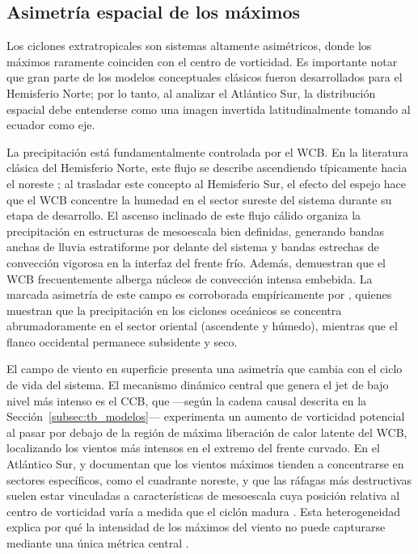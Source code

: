 \subsection{Asimetría espacial de los máximos}\label{subsec:tb_kde_asimetria}

Los ciclones extratropicales son sistemas altamente asimétricos, donde los máximos raramente coinciden con el centro de vorticidad. Es importante notar que gran parte de los modelos conceptuales clásicos fueron desarrollados para el Hemisferio Norte; por lo tanto, al analizar el Atlántico Sur, la distribución espacial debe entenderse como una imagen invertida latitudinalmente tomando al ecuador como eje.

La precipitación está fundamentalmente controlada por el WCB. En la literatura clásica del Hemisferio Norte, este flujo se describe ascendiendo típicamente hacia el noreste \citep{blanchard2021warm}; al trasladar este concepto al Hemisferio Sur, el efecto del espejo hace que el WCB concentre la humedad en el sector sureste del sistema durante su etapa de desarrollo. El ascenso inclinado de este flujo cálido organiza la precipitación en estructuras de mesoescala bien definidas, generando bandas anchas de lluvia estratiforme por delante del sistema y bandas estrechas de convección vigorosa en la interfaz del frente frío. Además, \citet{oertel2021warm} demuestran que el WCB frecuentemente alberga núcleos de convección intensa embebida. La marcada asimetría de este campo es corroborada empíricamente por \citet{naud2020evaluation}, quienes muestran que la precipitación en los ciclones oceánicos se concentra abrumadoramente en el sector oriental (ascendente y húmedo), mientras que el flanco occidental permanece subsidente y seco.

El campo de viento en superficie presenta una asimetría que cambia con el ciclo de vida del sistema. El mecanismo dinámico central que genera el jet de bajo nivel más intenso es el CCB, que —según la cadena causal descrita en la Sección~\ref{subsec:tb_modelos}— experimenta un aumento de vorticidad potencial al pasar por debajo de la región de máxima liberación de calor latente del WCB, localizando los vientos más intensos en el extremo del frente curvado. En el Atlántico Sur, \citet{bitencourt2010relating} y \citet{cardoso2022synoptic} documentan que los vientos máximos tienden a concentrarse en sectores específicos, como el cuadrante noreste, y que las ráfagas más destructivas suelen estar vinculadas a características de mesoescala cuya posición relativa al centro de vorticidad varía a medida que el ciclón madura \citep{eisenstein2023identification}. Esta heterogeneidad explica por qué la intensidad de los máximos del viento no puede capturarse mediante una única métrica central \citep{corner2025classification}.

